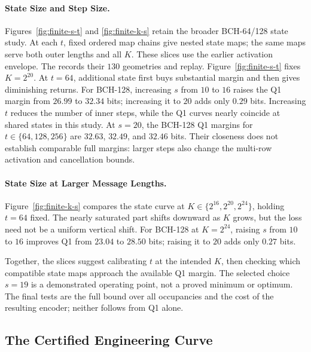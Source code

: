 \paragraph{State Size and Step Size.}
Figures~\ref{fig:finite-s-t} and \ref{fig:finite-k-s} retain the broader
BCH-64/128 state study. At each $t$, fixed ordered map chains give nested
state maps; the same maps serve both outer lengths and all $K$.
These slices use the earlier activation envelope. The
records their $130$ geometries and replay.
Figure~\ref{fig:finite-s-t} fixes $K=2^{20}$. At $t=64$, additional state
first buys substantial margin and then gives diminishing returns.
For BCH-128, increasing $s$ from $10$ to $16$ raises the Q1 margin
from $26.99$ to $32.34$ bits; increasing it to $20$ adds only $0.29$ bits.
Increasing $t$ reduces the number of inner steps, while the Q1 curves
nearly coincide at shared states in this study. At $s=20$, the BCH-128 Q1 margins for
$t\in\{64,128,256\}$ are $32.63$, $32.49$, and $32.46$ bits.
Their closeness does not establish comparable full margins: larger steps
also change the multi-row activation and cancellation bounds.



\paragraph{State Size at Larger Message Lengths.}
Figure~\ref{fig:finite-k-s} compares the state curve at
$K\in\{2^{16},2^{20},2^{24}\}$, holding $t=64$ fixed.
The nearly saturated part shifts downward as $K$ grows, but the loss need
not be a uniform vertical shift. For BCH-128 at $K=2^{24}$, raising $s$
from $10$ to $16$ improves Q1 from $23.04$ to $28.50$ bits; raising it to
$20$ adds only $0.27$ bits.



Together, the slices suggest calibrating $t$ at the intended $K$, then
checking which compatible state maps approach the available Q1 margin.
The selected choice $s=19$ is a demonstrated operating point, not a proved
minimum or optimum. The final tests are the full bound over all occupancies
and the cost of the resulting encoder; neither follows from Q1 alone.
\FloatBarrier

\subsection{The Certified Engineering Curve}
\label{sec:finite-engineering-curve}

